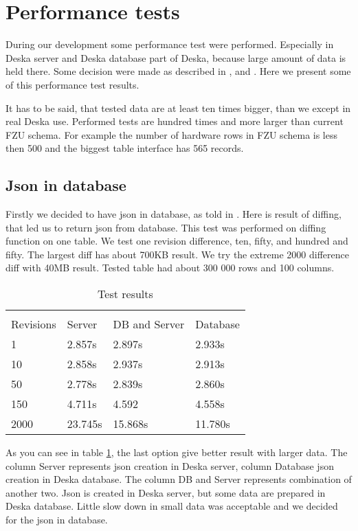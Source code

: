 \documentclass[deska]{subfiles}
\begin{document}
\section{Performance tests}
\label{sec:performance}

During our development some performance test were performed. Especially in Deska server and Deska database
part of Deska, because large amount of data is held there. Some decision were made as described in
,  and .
Here we present some of this performance test results.

It has to be said, that tested data are at least ten times bigger, than we
except in real Deska use. Performed tests are hundred times and more larger
than current FZU schema.
For example the number of hardware rows in FZU schema is less then 500 
and the biggest table interface has 565 records.

\subsection{Json in database}
\label{sec:test-json}
Firstly we decided to have json in database, as told in .
Here is result of diffing, that led us to
return json from database.
This test was performed on diffing function on one table.
We test one revision difference, ten, fifty, and hundred and fifty.
The largest diff has about 700KB result.
We try the extreme 2000 difference diff with 40MB result.
Tested table had about 300 000 rows and 100 columns.

\begin{longtable}{ l | l | l | l}
\label{test:json}
\caption{Test results}\\
Revisions & Server & DB and Server & Database \\
\hline
\endhead
1 & 2.857s & 2.897s & 2.933s \\
10 & 2.858s & 2.937s & 2.913s \\
50 & 2.778s & 2.839s & 2.860s \\
150 & 4.711s & 4.592 & 4.558s \\
2000 & 23.745s & 15.868s & 11.780s \\
\end{longtable}

As you can see in table \ref{test:json}, the last option give better result with larger data.
The column Server represents json creation in Deska server, column Database json creation in
Deska database. The column DB and Server represents combination of another two. Json is created
in Deska server, but some data are prepared in Deska database.
Little slow down in small data was acceptable and we decided for the json in database.
\end{document}
